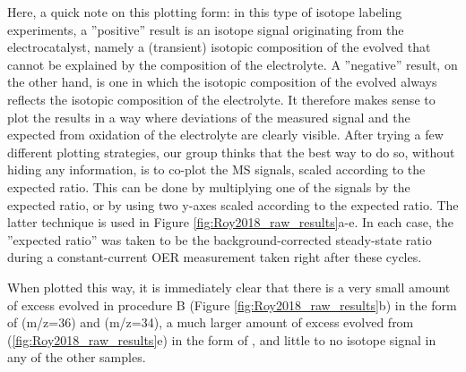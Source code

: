 Here, a quick note on this plotting form: in this type of isotope labeling experiments, a ''positive'' result is an isotope signal originating from the electrocatalyst, namely a (transient) isotopic composition of the evolved  that cannot be explained by the composition of the electrolyte. A ''negative'' result, on the other hand, is one in which the isotopic composition of the evolved  always reflects the isotopic composition of the electrolyte. It therefore makes sense to plot the results in a way where deviations of the measured  signal and the expected  from oxidation of the electrolyte are clearly visible. After trying a few different plotting strategies, our group thinks that the best way to do so, without hiding any information, is to co-plot the MS signals, scaled according to the expected ratio. This can be done by multiplying one of the signals by the expected ratio, or by using two y-axes scaled according to the expected ratio. The latter technique is used in Figure \ref{fig:Roy2018_raw_results}a-e. In each case, the ''expected ratio'' was taken to be the background-corrected steady-state ratio during a constant-current OER measurement taken right after these cycles.

When plotted this way, it is immediately clear that there is a very small amount of excess  evolved in procedure B (Figure \ref{fig:Roy2018_raw_results}b) in the form of  (m/z=36) and  (m/z=34), a much larger amount of excess  evolved from  (\ref{fig:Roy2018_raw_results}e) in the form of , and little to no isotope signal in any of the other samples. 

